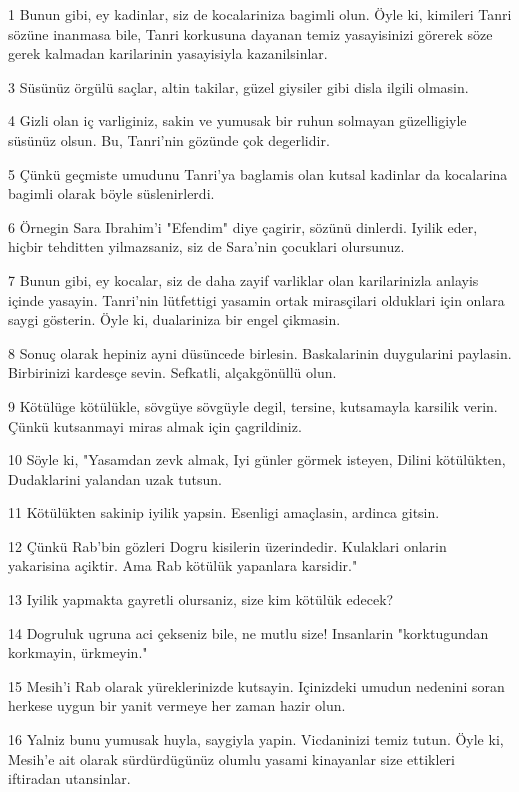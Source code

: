 \par 1 Bunun gibi, ey kadinlar, siz de kocalariniza bagimli olun. Öyle ki, kimileri Tanri sözüne inanmasa bile, Tanri korkusuna dayanan temiz yasayisinizi görerek söze gerek kalmadan karilarinin yasayisiyla kazanilsinlar.
\par 3 Süsünüz örgülü saçlar, altin takilar, güzel giysiler gibi disla ilgili olmasin.
\par 4 Gizli olan iç varliginiz, sakin ve yumusak bir ruhun solmayan güzelligiyle süsünüz olsun. Bu, Tanri'nin gözünde çok degerlidir.
\par 5 Çünkü geçmiste umudunu Tanri'ya baglamis olan kutsal kadinlar da kocalarina bagimli olarak böyle süslenirlerdi.
\par 6 Örnegin Sara Ibrahim'i "Efendim" diye çagirir, sözünü dinlerdi. Iyilik eder, hiçbir tehditten yilmazsaniz, siz de Sara'nin çocuklari olursunuz.
\par 7 Bunun gibi, ey kocalar, siz de daha zayif varliklar olan karilarinizla anlayis içinde yasayin. Tanri'nin lütfettigi yasamin ortak mirasçilari olduklari için onlara saygi gösterin. Öyle ki, dualariniza bir engel çikmasin.
\par 8 Sonuç olarak hepiniz ayni düsüncede birlesin. Baskalarinin duygularini paylasin. Birbirinizi kardesçe sevin. Sefkatli, alçakgönüllü olun.
\par 9 Kötülüge kötülükle, sövgüye sövgüyle degil, tersine, kutsamayla karsilik verin. Çünkü kutsanmayi miras almak için çagrildiniz.
\par 10 Söyle ki, "Yasamdan zevk almak, Iyi günler görmek isteyen, Dilini kötülükten, Dudaklarini yalandan uzak tutsun.
\par 11 Kötülükten sakinip iyilik yapsin. Esenligi amaçlasin, ardinca gitsin.
\par 12 Çünkü Rab'bin gözleri Dogru kisilerin üzerindedir. Kulaklari onlarin yakarisina açiktir. Ama Rab kötülük yapanlara karsidir."
\par 13 Iyilik yapmakta gayretli olursaniz, size kim kötülük edecek?
\par 14 Dogruluk ugruna aci çekseniz bile, ne mutlu size! Insanlarin "korktugundan korkmayin, ürkmeyin."
\par 15 Mesih'i Rab olarak yüreklerinizde kutsayin. Içinizdeki umudun nedenini soran herkese uygun bir yanit vermeye her zaman hazir olun.
\par 16 Yalniz bunu yumusak huyla, saygiyla yapin. Vicdaninizi temiz tutun. Öyle ki, Mesih'e ait olarak sürdürdügünüz olumlu yasami kinayanlar size ettikleri iftiradan utansinlar.

